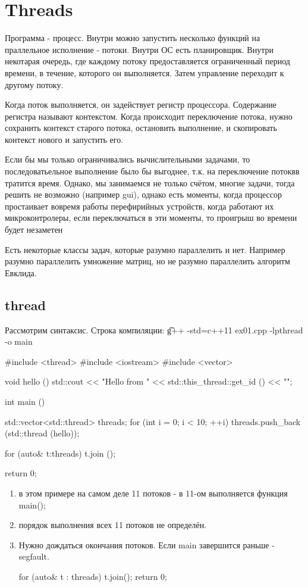 \chapter{Threads}
Программа - процесс.
Внутри можно запустить несколько функций на праллельное исполнение - потоки.
Внутри ОС есть планировщик. Внутри некотарая очередь, где каждому потоку предоставляется ограниченный период времени, в течение, которого он выполняется. Затем управление переходит к другому потоку.

Когда поток выполняется, он задействует регистр процессора. Содержание регистра называют контекстом. Когда происходит переключение потока, нужно сохранить контекст старого потока, остановить выполнение, и скопировать контекст нового и запустить его.

Если бы мы только ограничивались вычислительными задачами, то последоватьельное выполнение было бы выгоднее, т.к. на переключение потоквв тратится время. Однако, мы занимаемся не только счётом, многие задачи, тогда решить не возможно (например gui), однако есть моменты, когда процессор простаивает вовремя работы перефирийных устройств, когда работают их микроконтролеры, если переключаться в эти моменты, то проигрыш во времени будет незаметен

Есть некоторые классы задач, которые разумно параллелить и нет. 
Например разумно параллелить умножение матриц, но не разумно параллелить алгоритм Евклида.

\section{thread}

Рассмотрим синтаксис.
Строка компиляции: \t{g++ -std=c++11  ex01.cpp -lpthread -o main}

\begin{cppcode}
#include <thread>
#include <iostream>
#include <vector>

void hello () {
  std::cout << "Hello from " << std::this_thread::get_id () << "\n";
}

int main () {
  std::vector<std::thread> threads;
  for (int i = 0; i < 10; ++i) {
    threads.push_back (std::thread (hello));
  }

  for (auto& t:threads) {
    t.join ();
  }

  return 0;
}
\end{cppcode}

\begin{enumerate}
    \item  в этом примере на самом деле 11 потоков - в 11-ом выполняется функция main();
    \item порядок выполнения всех 11 потоков не определён.
    \item Нужно дождаться окончания потоков. Если main завершится раньше - segfault.
	\begin{cppcode}
	for (auto& t : threads) {
		t.join();
	}
	return 0;
	\end{cppcode}

\end{enumerate}

